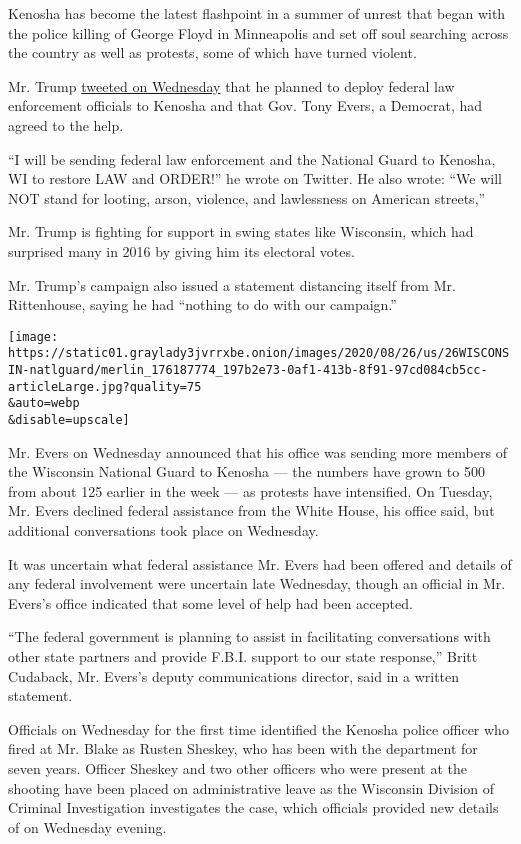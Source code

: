 Kenosha has become the latest flashpoint in a summer of unrest that
began with the police killing of George Floyd in Minneapolis and set off
soul searching across the country as well as protests, some of which
have turned violent.

Mr. Trump
\href{https://twitter.com/realDonaldTrump/status/1298671451030073344?s=20}{tweeted
on Wednesday} that he planned to deploy federal law enforcement
officials to Kenosha and that Gov. Tony Evers, a Democrat, had agreed to
the help.

``I will be sending federal law enforcement and the National Guard to
Kenosha, WI to restore LAW and ORDER!'' he wrote on Twitter. He also
wrote: ``We will NOT stand for looting, arson, violence, and lawlessness
on American streets,''

Mr. Trump is fighting for support in swing states like Wisconsin, which
had surprised many in 2016 by giving him its electoral votes.

Mr. Trump's campaign also issued a statement distancing itself from Mr.
Rittenhouse, saying he had ``nothing to do with our campaign.''

\texttt{[image: https://static01.graylady3jvrrxbe.onion/images/2020/08/26/us/26WISCONSIN-natlguard/merlin\_176187774\_197b2e73-0af1-413b-8f91-97cd084cb5cc-articleLarge.jpg?quality=75\\\&auto=webp\\\&disable=upscale]}

Mr. Evers on Wednesday announced that his office was sending more
members of the Wisconsin National Guard to Kenosha --- the numbers have
grown to 500 from about 125 earlier in the week --- as protests have
intensified. On Tuesday, Mr. Evers declined federal assistance from the
White House, his office said, but additional conversations took place on
Wednesday.

It was uncertain what federal assistance Mr. Evers had been offered and
details of any federal involvement were uncertain late Wednesday, though
an official in Mr. Evers's office indicated that some level of help had
been accepted.

``The federal government is planning to assist in facilitating
conversations with other state partners and provide F.B.I. support to
our state response,'' Britt Cudaback, Mr. Evers's deputy communications
director, said in a written statement.

Officials on Wednesday for the first time identified the Kenosha police
officer who fired at Mr. Blake as Rusten Sheskey, who has been with the
department for seven years. Officer Sheskey and two other officers who
were present at the shooting have been placed on administrative leave as
the Wisconsin Division of Criminal Investigation investigates the case,
which officials provided new details of on Wednesday evening.

